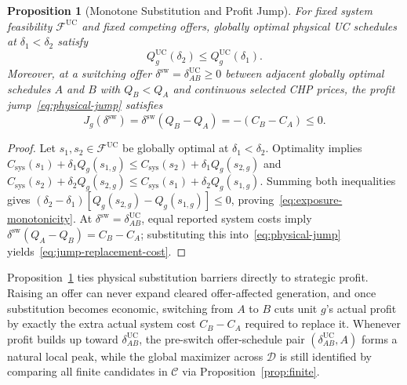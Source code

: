 \documentclass[journal]{IEEEtran}
\newtheorem{proposition}{Proposition}
\newcommand{\UC}{\mathrm{UC}}
\begin{document}
\begin{proposition}[Monotone Substitution and Profit Jump]
\label{cor:exposure}
For fixed system feasibility $\mathcal{F}^{\UC}$ and fixed competing offers, globally optimal physical UC schedules at $\delta_1<\delta_2$ satisfy
\begin{equation}
Q_g^{\UC}(\delta_2) \le Q_g^{\UC}(\delta_1).\label{eq:exposure-monotonicity}
\end{equation}
Moreover, at a switching offer $\delta^{\mathrm{sw}}\!\!=\!\!\delta_{AB}^{\UC}\!\!\ge\!\! 0$ between adjacent globally optimal schedules $A$ and $B$ with $Q_B\!\!<\!\!Q_A$ and continuous selected CHP prices, the profit jump~\eqref{eq:physical-jump} satisfies
\begin{equation}
J_g(\delta^{\mathrm{sw}})
= \delta^{\mathrm{sw}}(Q_B - Q_A)
= -(C_B - C_A) \le 0.\label{eq:jump-replacement-cost}
\end{equation}
\end{proposition}

\begin{proof}
Let $s_1,s_2\!\!\in\!\!\mathcal{F}^{\UC}$ be globally optimal at $\delta_1\!\!<\!\!\delta_2$. Optimality implies $C_{\mathrm{sys}}(s_1)\!\!+\!\!\delta_1 Q_g(s_{1,g})\le C_{\mathrm{sys}}(s_2)+\delta_1 Q_g(s_{2,g})$ and $C_{\mathrm{sys}}(s_2)\!\!+\!\!\delta_2 Q_g(s_{2,g})\!\!\le\!\! C_{\mathrm{sys}}(s_1)\!\!+\!\!\delta_2 Q_g(s_{1,g})$. Summing both inequalities gives $(\delta_2\!\!-\!\!\delta_1)[Q_g(s_{2,g})\!\!-\!\!Q_g(s_{1,g})]\!\!\le\!\! 0$, proving~\eqref{eq:exposure-monotonicity}. At $\delta^{\mathrm{sw}}\!\!=\!\!\delta_{AB}^{\UC}$, equal reported system costs imply $\delta^{\mathrm{sw}}(Q_A\!\!-\!\!Q_B)\!\!=\!\!C_B\!\!-\!\!C_A$; substituting this into~\eqref{eq:physical-jump} yields~\eqref{eq:jump-replacement-cost}.
\end{proof}

Proposition~\ref{cor:exposure} ties physical substitution barriers directly to strategic profit. Raising an offer can never expand cleared offer-affected generation, and once substitution becomes economic, switching from $A$ to $B$ cuts unit $g$'s actual profit by exactly the extra actual system cost $C_B-C_A$ required to replace it. Whenever profit builds up toward $\delta_{AB}^{\UC}$, the pre-switch offer-schedule pair $(\delta_{AB}^{\UC},A)$ forms a natural local peak, while the global maximizer across $\mathcal{D}$ is still identified by comparing all finite candidates in $\mathcal{C}$ via Proposition~\ref{prop:finite}.

\end{document}
